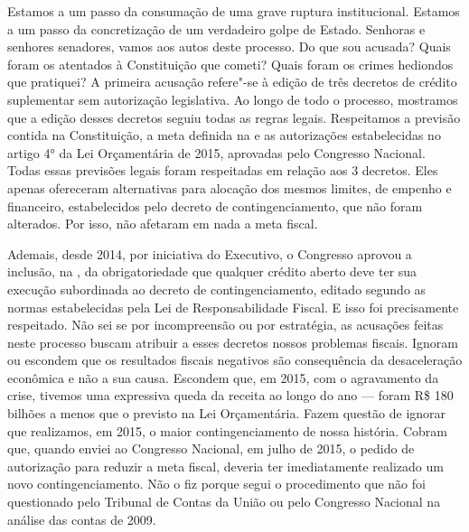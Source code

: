 Estamos a um passo da consumação de uma grave ruptura institucional.
Estamos a um passo da concretização de um verdadeiro golpe de Estado.
Senhoras e senhores senadores, vamos aos autos deste processo. Do que
sou acusada? Quais foram os atentados à Constituição que cometi? Quais
foram os crimes hediondos que pratiquei? A primeira acusação refere"-se à
edição de três decretos de crédito suplementar sem autorização
legislativa. Ao longo de todo o processo, mostramos que a edição desses
decretos seguiu todas as regras legais. Respeitamos a previsão contida
na Constituição, a meta definida na  e as autorizações estabelecidas
no artigo 4° da Lei Orçamentária de 2015, aprovadas pelo Congresso
Nacional. Todas essas previsões legais foram respeitadas em relação aos
3 decretos. Eles apenas ofereceram alternativas para alocação dos mesmos
limites, de empenho e financeiro, estabelecidos pelo decreto de
contingenciamento, que não foram alterados. Por isso, não afetaram em
nada a meta fiscal.

Ademais, desde 2014, por iniciativa do Executivo, o
Congresso aprovou a inclusão, na , da obrigatoriedade que qualquer
crédito aberto deve ter sua execução subordinada ao decreto de
contingenciamento, editado segundo as normas estabelecidas pela Lei de
Responsabilidade Fiscal. E isso foi precisamente respeitado. Não sei se
por incompreensão ou por estratégia, as acusações feitas neste processo
buscam atribuir a esses decretos nossos problemas fiscais. Ignoram ou
escondem que os resultados fiscais negativos são consequência da
desaceleração econômica e não a sua causa. Escondem que, em 2015, com o
agravamento da crise, tivemos uma expressiva queda da receita ao longo
do ano --- foram R\$ 180 bilhões a menos que o previsto na Lei
Orçamentária. Fazem questão de ignorar que realizamos, em 2015, o maior
contingenciamento de nossa história. Cobram que, quando enviei ao
Congresso Nacional, em julho de 2015, o pedido de autorização para
reduzir a meta fiscal, deveria ter imediatamente realizado um novo
contingenciamento. Não o fiz porque segui o procedimento que não foi
questionado pelo Tribunal de Contas da União ou pelo Congresso Nacional
na análise das contas de 2009.

